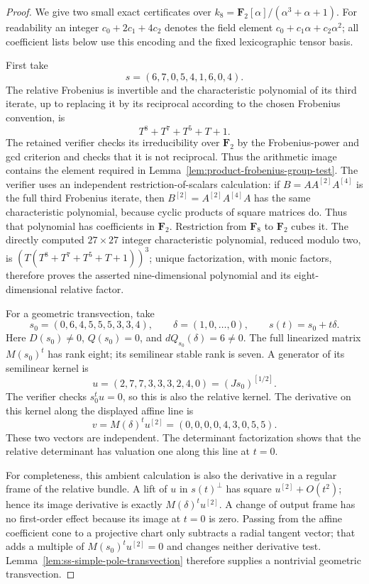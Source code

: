 \begin{proof}
We give two small exact certificates over
$k_8=\mathbf F_2[\alpha]/(\alpha^3+\alpha+1)$.
For readability an integer $c_0+2c_1+4c_2$ denotes the field element
$c_0+c_1\alpha+c_2\alpha^2$; all coefficient lists below use this
encoding and the fixed lexicographic tensor basis.

First take
\[
                s=(6,7,0,5,4,1,6,0,4).
\]
The relative Frobenius is invertible and the characteristic polynomial
of its third iterate, up to replacing it by its reciprocal according
to the chosen Frobenius convention, is
\begin{equation}\label{eq:ss-degree-one-Frobenius-polynomial}
                    T^8+T^7+T^5+T+1.
\end{equation}
The retained verifier checks its irreducibility over $\mathbf F_2$
by the Frobenius-power and gcd criterion and checks that it is not
reciprocal. Thus the arithmetic image contains the element required
in Lemma~\ref{lem:product-frobenius-group-test}.
The verifier uses an independent restriction-of-scalars calculation:
if $B=A A^{[2]}A^{[4]}$ is the full third Frobenius iterate, then
$B^{[2]}=A^{[2]}A^{[4]}A$ has the same characteristic polynomial,
because cyclic products of square matrices do. Thus that polynomial
has coefficients in $\mathbf F_2$. Restriction from $\mathbf F_8$ to
$\mathbf F_2$ cubes it. The directly computed $27\times27$ integer
characteristic polynomial, reduced modulo two, is
$(T(T^8+T^7+T^5+T+1))^3$; unique factorization, with monic factors,
therefore proves the asserted nine-dimensional polynomial and its
eight-dimensional relative factor.

For a geometric transvection, take
\[
 s_0=(0,6,4,5,5,5,3,3,4),\qquad\delta=(1,0,\ldots,0),
 \qquad s(t)=s_0+t\delta.
\]
Here $D(s_0)\ne0$, $Q(s_0)=0$, and $dQ_{s_0}(\delta)=6\ne0$.
The full linearized matrix $M(s_0)^t$ has rank eight; its semilinear
stable rank is seven. A generator of its semilinear kernel is
\[
 u=(2,7,7,3,3,3,2,4,0)=(Js_0)^{[1/2]}.
\]
The verifier checks $s_0^tu=0$, so this is also the relative kernel.
The derivative on this kernel along the displayed affine line is
\[
 v=M(\delta)^tu^{[2]}=(0,0,0,0,4,3,0,5,5).
\]
These two vectors are independent. The determinant factorization
shows that the relative determinant has valuation one along this
line at $t=0$.

For completeness, this ambient calculation is also the derivative
in a regular frame of the relative bundle. A lift of $u$ in
$s(t)^\perp$ has square $u^{[2]}+O(t^2)$; hence its image derivative
is exactly $M(\delta)^tu^{[2]}$. A change of output frame has no
first-order effect because its image at $t=0$ is zero. Passing
from the affine coefficient cone to a projective chart only subtracts
a radial tangent vector; that adds a multiple of
$M(s_0)^tu^{[2]}=0$ and changes neither derivative test.
Lemma~\ref{lem:ss-simple-pole-transvection} therefore supplies a
nontrivial geometric transvection.


\end{proof}

